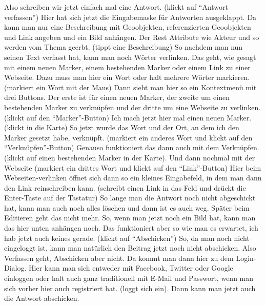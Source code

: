 Also schreiben wir jetzt einfach mal eine Antwort. (klickt auf "`Antwort verfassen"') Hier hat sich jetzt die Eingabemaske f{\"u}r Antworten ausgeklappt. Da kann man nur eine Beschreibung mit Geoobjekten, referenzierten Geoobjekten und Link angeben und ein Bild anh{\"a}ngen. Der Rest Attribute wie Akteur und so werden vom Thema geerbt. (tippt eine Beschreibung) So nachdem man nun seinen Text verfasst hat, kann man noch W{\"o}rter verlinken. Das geht, wie gesagt mit einem neuen Marker, einem bestehenden Marker oder einem Link zu einer Webseite. Dazu muss man hier ein Wort oder halt mehrere W{\"o}rter markieren. (markiert ein Wort mit der Maus) Dann sieht man hier so ein Kontextmen{\"u} mit drei Buttons. Der erste ist f{\"u}r einen neuen Marker, der zweite um einen bestehenden Marker zu verkn{\"u}pfen und der dritte um eine Webseite zu verlinken. (klickt auf den "`Marker"'-Button) Ich mach jetzt hier mal einen neuen Marker. (klickt in die Karte) So jetzt wurde das Wort und der Ort, an dem ich den Marker gesetzt habe, verkn{\"u}pft. (markiert ein anderes Wort und klickt auf den "`Verkn{\"u}pfen"'-Button) Genauso funktioniert das dann auch mit dem Verkn{\"u}pfen. (klickt auf einen bestehenden Marker in der Karte). Und dann nochmal mit der Webseite (markiert ein drittes Wort und klickt auf den "`Link"'-Button) Hier beim Webseiten-verlinken {\"o}ffnet sich dann so ein kleines Eingabefeld, in dem man dann den Link reinschreiben kann. (schreibt einen Link in das Feld und dr{\"u}ckt die Enter-Taste auf der Tastatur) So lange man die Antwort noch nicht abgeschickt hat, kann man auch noch alles l{\"o}schen und dann ist es auch weg. Sp{\"a}ter beim Editieren geht das nicht mehr. So, wenn man jetzt noch ein Bild hat, kann man das hier unten anh{\"a}ngen noch. Das funktioniert aber so wie man es erwartet, ich hab jetzt auch keines gerade. (klickt auf "`Abschicken"') So, da man noch nicht eingeloggt ist, kann man nat{\"u}rlich den Beitrag jetzt noch nicht abschicken. Also Verfassen geht, Abschicken aber nicht. Da kommt man dann hier zu dem Login-Dialog. Hier kann man sich entweder mit Facebook, Twitter oder Google einloggen oder halt auch ganz traditionell mit E-Mail und Passwort, wenn man sich vorher hier auch registriert hat. (loggt sich ein). Dann kann man jetzt auch die Antwort abschicken.\\
